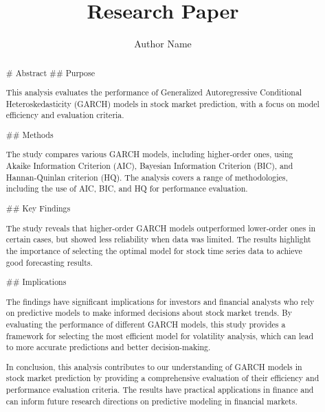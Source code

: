 \documentclass[conference]{IEEEtran}
\title{Research Paper}
\author{Author Name}
\begin{document}
\maketitle

\begin{abstract}
\# Abstract
\#\# Purpose

This analysis evaluates the performance of Generalized Autoregressive Conditional Heteroskedasticity (GARCH) models in stock market prediction, with a focus on model efficiency and evaluation criteria.

\#\# Methods

The study compares various GARCH models, including higher-order ones, using Akaike Information Criterion (AIC), Bayesian Information Criterion (BIC), and Hannan-Quinlan criterion (HQ). The analysis covers a range of methodologies, including the use of AIC, BIC, and HQ for performance evaluation.

\#\# Key Findings

The study reveals that higher-order GARCH models outperformed lower-order ones in certain cases, but showed less reliability when data was limited. The results highlight the importance of selecting the optimal model for stock time series data to achieve good forecasting results.

\#\# Implications

The findings have significant implications for investors and financial analysts who rely on predictive models to make informed decisions about stock market trends. By evaluating the performance of different GARCH models, this study provides a framework for selecting the most efficient model for volatility analysis, which can lead to more accurate predictions and better decision-making.

In conclusion, this analysis contributes to our understanding of GARCH models in stock market prediction by providing a comprehensive evaluation of their efficiency and performance evaluation criteria. The results have practical applications in finance and can inform future research directions on predictive modeling in financial markets.
\end{abstract}

\begin{IEEEkeywords}

\end{IEEEkeywords}
\end{document}
